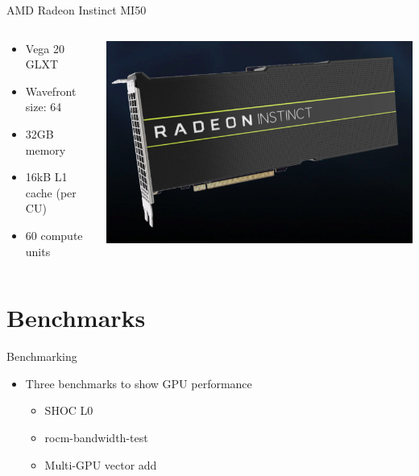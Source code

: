 \documentclass[aspectratio=169]{beamer}
\begin{document}
\begin{frame}{AMD Radeon Instinct MI50}

\begin{columns}
\begin{column}{0.5\textwidth}
    \begin{itemize}
    \item Vega 20 GLXT
    \item Wavefront size: 64
    \item 32GB memory
    \item 16kB L1 cache (per CU)
    \item 60 compute units
    \end{itemize}
\end{column}
\begin{column}{0.5\textwidth}  %
    \begin{center}
     \includegraphics[width=1\textwidth]{figs/mi50.png}
     \end{center}
\end{column} 
\end{columns}

\end{frame}

\section{Benchmarks}
\begin{frame}{Benchmarking}
    \begin{itemize}
    \item Three benchmarks to show GPU performance
        \begin{itemize}
            \item SHOC L0
            \item rocm-bandwidth-test
            \item Multi-GPU vector add
        \end{itemize}
    \end{itemize}
    
\end{frame}
\end{document}
